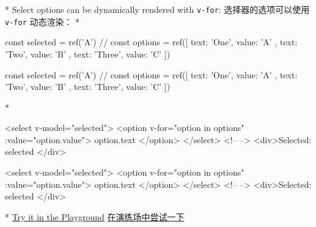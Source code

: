 \begin{paracol}{2}
\switchcolumn[0]*%
Select options can be dynamically rendered with \texttt{v-for}:
\switchcolumn
选择器的选项可以使用 \texttt{v-for} 动态渲染：
\switchcolumn[0]*%
\begin{codeJs}
const selected = ref('A')
//
const options = ref([
  { text: 'One', value: 'A' },
  { text: 'Two', value: 'B' },
  { text: 'Three', value: 'C' }
])
\end{codeJs}
\switchcolumn
\begin{codeJs}
const selected = ref('A')
//
const options = ref([
  { text: 'One', value: 'A' },
  { text: 'Two', value: 'B' },
  { text: 'Three', value: 'C' }
])
\end{codeJs}
\switchcolumn[0]*%
\begin{codeHtml}
<select v-model="selected">
  <option v-for="option in options" :value="option.value">
    {{ option.text }}
  </option>
</select>
<!-- -->
<div>Selected: {{ selected }}</div>
\end{codeHtml}
\switchcolumn
\begin{codeHtml}
<select v-model="selected">
  <option v-for="option in options" :value="option.value">
    {{ option.text }}
  </option>
</select>
<!-- -->
<div>Selected: {{ selected }}</div>
\end{codeHtml}
\switchcolumn[0]*%
\href{https://play.vuejs.org/\#eNplkMFugzAQRH9l5YtbKYU7IpFoP6CH9lb3EMGiWgLbMguthPzvXduEJMqNYUazb7yKxrlimVFUop5arx3BhDS7kzJ6dNYTrOCxhwC9tyNIjkpllGmtmWJ0wJawg2MMPclGPl9N60jzx+Z9KQPcRfhHFch3g/IAy3mYkVUjIRzu/M9fe+O/Pvo/Hm8b3jihzDdfr8s8gwewIBzdcCZkBVBnXFheRtvhcFTiwq9ECnAkQ3Okt54Dm9TmskYJqNLR3SyS3BsYct3CRYSFwGCpusx/M0qZTydKRXWnl9PHBlPFhv1lQ6jL6MZl+xoR/gFjPZTD}{Try
it in the Playground}
\switchcolumn
\href{https://play.vuejs.org/\#eNplkMFugzAQRH9l5YtbKYU7IpFoP6CH9lb3EMGiWgLbMguthPzvXduEJMqNYUazb7yKxrlimVFUop5arx3BhDS7kzJ6dNYTrOCxhwC9tyNIjkpllGmtmWJ0wJawg2MMPclGPl9N60jzx+Z9KQPcRfhHFch3g/IAy3mYkVUjIRzu/M9fe+O/Pvo/Hm8b3jihzDdfr8s8gwewIBzdcCZkBVBnXFheRtvhcFTiwq9ECnAkQ3Okt54Dm9TmskYJqNLR3SyS3BsYct3CRYSFwGCpusx/M0qZTydKRXWnl9PHBlPFhv1lQ6jL6MZl+xoR/gFjPZTD}{在演练场中尝试一下}
\end{paracol}

